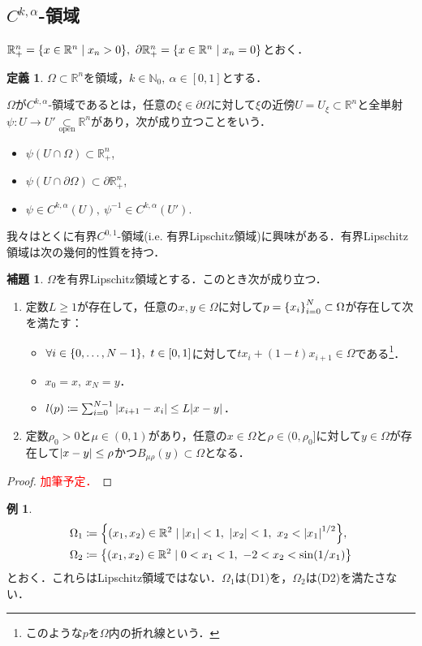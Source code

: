 \documentclass[a4paper]{ltjsarticle}
\newcommand{\Rset}{\mathbb{R}}
\newcommand{\Nset}{\mathbb{N}}
\newcommand{\opensub}{\underset{\text{open}}{\subset}}
\newcommand{\Om}{\Omega}
\newcommand{\pOm}{\partial\Omega}
\newcommand{\1}{\mathbbm{1}}
\numberwithin{equation}{section}
\theoremstyle{definition}
\newtheorem{dfn}[thm]{定義}
\newtheorem{lem}[thm]{補題}
\newtheorem{eg}[thm]{例}
\begin{document}
\subsection{\texorpdfstring{$C^{k,\alpha}$}{TEXT}-領域}
$\Rset^n_+=\qty{x\in\Rset^n\mid x_n>0},\ \partial\Rset^n_+=\qty{x\in\Rset^n\mid x_n=0}$とおく．
\begin{dfn}
    $\Om\subset \Rset^n$を領域，$k\in\Nset_0,\ \alpha\in[0,1]$とする．

    $\Omega$が$C^{k,\alpha}$-領域であるとは，任意の$\xi\in \pOm$に対して$\xi$の近傍$U=U_\xi\subset \Rset^n$と全単射$\psi\colon U\to U'\opensub \Rset^n$があり，次が成り立つことをいう．
    \begin{itemize}
        \item $\psi(U\cap \Om)\subset \Rset^n_+$,
        \item $\psi(U\cap \pOm)\subset \partial\Rset^n_+$,
        \item $\psi\in C^{k,\alpha}(U),\ \psi^{-1}\in C^{k,\alpha}(U')$.
    \end{itemize}
\end{dfn}
我々はとくに有界$C^{0,1}$-領域(i.e. 有界Lipschitz領域)に興味がある．有界Lipschitz領域は次の幾何的性質を持つ．
\begin{lem}\label{lem:lip_dom}
    $\Om$を有界Lipschitz領域とする．このとき次が成り立つ．
    \begin{enumerate}[(D1)]
        \item 定数$L\geq 1$が存在して，任意の$x,y\in \Om$に対して$p=\qty{x_i}_{i=0}^N\subset \Om$が存在して次を満たす：
        \begin{itemize}
            \item $\forall i\in\qty{0,\ldots,N-1},\ t\in [0,1]$に対して$tx_i+(1-t)x_{i+1}\in \Om$である\footnote{このような$p$を$\Om$内の折れ線という．}．
            \item $x_0=x,\ x_N=y$．
            \item $l(p)\coloneqq \sum_{i=0}^{N-1}\abs{x_{i+1}-x_i}\leq L\abs{x-y}$．
        \end{itemize}
        \item 定数$\rho_0>0$と$\mu\in(0,1)$があり，任意の$x\in \Om$と$\rho\in(0,\rho_0]$に対して$y\in\Om$が存在して$\abs{x-y}\leq \rho$かつ$B_{\mu\rho}(y)\subset \Om$となる．
    \end{enumerate}
\end{lem}
\begin{proof}
    \textcolor{red}{加筆予定．}
\end{proof}
\begin{eg}\label{non-lip_dom}
    \begin{align}
        \Om_1&\coloneqq \qty{(x_1,x_2)\in\Rset^2\mid \abs{x_1}<1,\ \abs{x_2}<1,\ x_2<\abs{x_1}^{1/2}}, \\
        \Om_2&\coloneqq \qty{(x_1,x_2)\in\Rset^2\mid 0<x_1<1,\ -2<x_2<\sin(1/x_1)}
    \end{align}
    とおく．これらはLipschitz領域ではない．$\Om_1$は(D1)を，$\Om_2$は(D2)を満たさない．
\end{eg}
\end{document}
